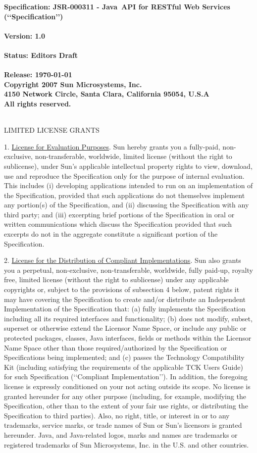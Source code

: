 {\bfseries Specification: JSR-000311 - Java\texttrademark\ API for RESTful Web Services (\lq\lq Specification\rq\rq)\\
\\
Version: 1.0\\
\\
Status: Editors Draft\\
\\
Release: \today
\\
Copyright 2007 Sun Microsystems, Inc.\\
4150 Network Circle, Santa Clara, California 95054, U.S.A\\
All rights reserved.
\\
\\
}


LIMITED LICENSE GRANTS


1. \underline{License for Evaluation Purposes}. Sun hereby grants you a
fully-paid, non-exclusive, non-transferable, worldwide, limited license
(without the right to sublicense), under Sun's applicable intellectual
property rights to view, download, use and reproduce the Specification
only for the purpose of internal evaluation. This includes (i)
developing applications intended to run on an implementation of the
Specification, provided that such applications do not themselves
implement any portion(s) of the Specification, and (ii) discussing the
Specification with any third party; and (iii) excerpting brief portions
of the Specification in oral or written communications which discuss the
Specification provided that such excerpts do not in the aggregate
constitute a significant portion of the Specification.


2. \underline{License for the Distribution of Compliant Implementations}. Sun also
grants you a perpetual, non-exclusive, non-transferable, worldwide,
fully paid-up, royalty free, limited license (without the right to
sublicense) under any applicable copyrights or, subject to the
provisions of subsection 4 below, patent rights it may have covering the
Specification to create and/or distribute an Independent Implementation
of the Specification that: (a) fully implements the Specification
including all its required interfaces and functionality; (b) does not
modify, subset, superset or otherwise extend the Licensor Name Space, or
include any public or protected packages, classes, Java interfaces,
fields or methods within the Licensor Name Space other than those
required/authorized by the Specification or Specifications being
implemented; and (c) passes the Technology Compatibility Kit (including
satisfying the requirements of the applicable TCK Users Guide) for such
Specification (\lq\lq Compliant Implementation\rq\rq). In addition, the foregoing
license is expressly conditioned on your not acting outside its scope.
No license is granted hereunder for any other purpose (including, for
example, modifying the Specification, other than to the extent of your
fair use rights, or distributing the Specification to third parties).
Also, no right, title, or interest in or to any trademarks, service
marks, or trade names of Sun or Sun's licensors is granted hereunder.
Java, and Java-related logos, marks and names are trademarks or
registered trademarks of Sun Microsystems, Inc. in the U.S. and other
countries.


